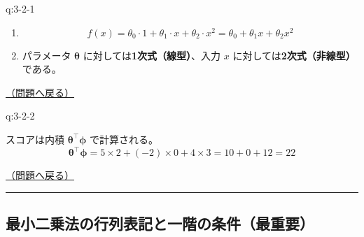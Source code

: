 \begin{answerbox}[phantomlabel=a:3-2-1]{q:3-2-1}

\begin{enumerate}
\def\labelenumi{\arabic{enumi}.}
\tightlist
\item
  \[f(x) = \theta_0 \cdot 1 + \theta_1 \cdot x + \theta_2 \cdot x^2 = \theta_0 + \theta_1 x + \theta_2 x^2\]
\item
  パラメータ \(\boldsymbol{\theta}\)
  に対しては\textbf{1次式（線型）}、入力 \(x\)
  に対しては\textbf{2次式（非線型）}である。
\end{enumerate}

\hfill 

\hyperref[q:3-2-1]{（問題へ戻る）}

\end{answerbox}

\begin{answerbox}[phantomlabel=a:3-2-2]{q:3-2-2}

スコアは内積 \(\boldsymbol{\theta}^\top \boldsymbol{\phi}\)
で計算される。 \[
\boldsymbol{\theta}^\top \boldsymbol{\phi} = 5 \times 2 + (-2) \times 0 + 4 \times 3 = 10 + 0 + 12 = 22
\]

\hfill 

\hyperref[q:3-2-2]{（問題へ戻る）}

\begin{center}\rule{0.5\linewidth}{0.5pt}\end{center}

\end{answerbox}

\subsection{最小二乗法の行列表記と一階の条件（最重要）}\label{ux6700ux5c0fux4e8cux4e57ux6cd5ux306eux884cux5217ux8868ux8a18ux3068ux4e00ux968eux306eux6761ux4ef6ux6700ux91cdux8981}

